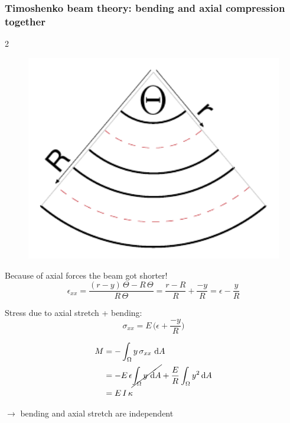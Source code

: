 \begin{frame}
  \frametitle{Timoshenko beam theory: bending and axial compression together}

  \begin{multicols}{2}
    \noindent
    \begin{figure}
    \centering
      \includegraphics[width=13cm, keepaspectratio=true]{sections/traditional_beams/images/TimoshenkoBeam3}
    \end{figure}
    
    Because of axial forces the beam got shorter!
    \begin{displaymath}
      \epsilon_{xx} = \frac{(r-y) \, \Theta - R \, \Theta}{R \, \Theta} = \frac{r-R}{R} + \frac{-y}{R} = \epsilon - \frac{y}{R}
    \end{displaymath}
    
    \vspace{0.5em}
    Stress due to axial stretch + bending:
    \begin{displaymath}
      \sigma_{xx} = E \, \bigl( \epsilon + \frac{-y}{R} \bigr)
    \end{displaymath}
    
    \begin{displaymath}
      \begin{alignedat}{1}
        M &= - \int_{\Omega} y \, \sigma_{xx} \, \dif A \\
          &= - E \, \epsilon \cancel{\int_{\Omega} y \, \dif A} + \frac{E}{R} \int_{\Omega} y^2 \dif A \\ 
          &= E \, I \, \kappa
    \end{alignedat}
    \end{displaymath}
    
    $\rightarrow$ bending and axial stretch are independent
  \end{multicols}

\end{frame}


